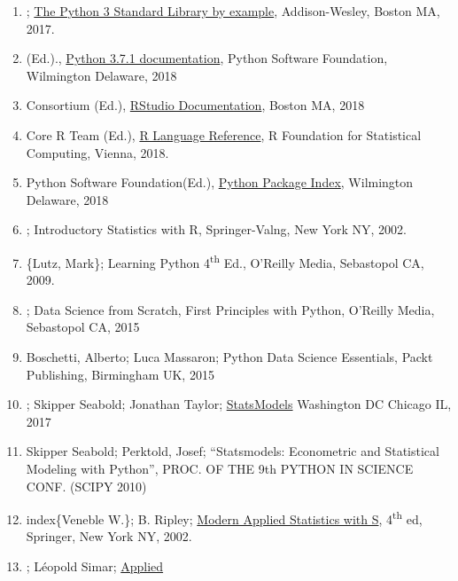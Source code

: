 \documentclass[]{book}
\theoremstyle{definition}
\theoremstyle{definition}
\theoremstyle{definition}
\theoremstyle{remark}
\begin{document}
\begin{enumerate}
\def\labelenumi{\arabic{enumi}.}
\setcounter{enumi}{1}
\item
  ;
  \href{https://www.amazon.com/Python-Standard-Library-Example-Developers-ebook/dp/B072QZZDV7}{The
  Python 3 Standard Library by example}, Addison-Wesley, Boston MA,
  2017.
\item
   (Ed.).,
  \href{https://docs.python.org/3.7/}{Python 3.7.1 documentation},
  Python Software Foundation, Wilmington Delaware, 2018
\item
   Consortium (Ed.),
  \href{https://support.rstudio.com/hc/en-us/categories/200035113-Documentation}{RStudio
  Documentation}, Boston MA, 2018
\item
  Core R Team (Ed.),
  \href{https://cran.r-project.org/doc/manuals/r-release/R-lang.html}{R
  Language Reference}, R Foundation for Statistical Computing, Vienna,
  2018.
\item
  Python Software Foundation(Ed.), \href{https://pypi.org/}{Python
  Package Index}, Wilmington Delaware, 2018
\item
  ; Introductory Statistics with R,
  Springer-Valng, New York NY, 2002.
\item
  \{Lutz, Mark\}; Learning Python 4\textsuperscript{th} Ed., O'Reilly
  Media, Sebastopol CA, 2009.
\item
  ; Data Science from Scratch, First Principles with
  Python, O'Reilly Media, Sebastopol CA, 2015
\item
  Boschetti, Alberto; Luca Massaron; Python Data Science Essentials,
  Packt Publishing, Birmingham UK, 2015
\item
  ; Skipper Seabold; Jonathan Taylor;
  \href{https://www.statsmodels.org/stable/index.html}{StatsModels}
  Washington DC Chicago IL, 2017
\item
  Skipper Seabold; Perktold, Josef; ``Statsmodels: Econometric and
  Statistical Modeling with Python'', PROC. OF THE 9th PYTHON IN SCIENCE
  CONF. (SCIPY 2010)
\item
  index\{Veneble W.\}; B. Ripley;
  \href{https://www.amazon.com/Modern-Applied-Statistics-Computing-ebook/dp/B000S1LWTE/ref=mt_kindle?_encoding=UTF8\&me=\&qid=1544630778}{Modern
  Applied Statistics with S}, 4\textsuperscript{th} ed, Springer, New
  York NY, 2002.
\item
  ; Léopold Simar;
  \href{http://pascal.upf.edu/am/dades/h-s-mva-book/mvahtml.html}{Applied
}
\end{enumerate}
\end{document}
